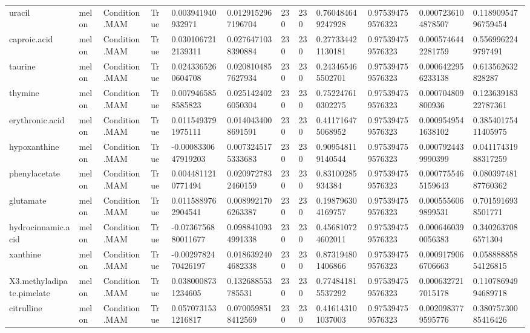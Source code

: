 \begin{longtable}{llllllllllll}
uracil & melon & Condition.MAM & True & 0.003941940932971 & 0.0129152967196704 & 230 & 230 & 0.760484649247928 & 0.975394759576323 & 0.0007236104878507 & 0.11890954796759454 \\
caproic.acid & melon & Condition.MAM & True & 0.0301067212139311 & 0.0276471038390884 & 230 & 230 & 0.277334421130181 & 0.975394759576323 & 0.0005746442281759 & 0.5569962249797491 \\
taurine & melon & Condition.MAM & True & 0.0243365260604708 & 0.0208104857627934 & 230 & 230 & 0.243465465502701 & 0.975394759576323 & 0.0006422956233138 & 0.613562632828287 \\
thymine & melon & Condition.MAM & True & 0.0079465858585823 & 0.0251424026050304 & 230 & 230 & 0.752247610302275 & 0.975394759576323 & 0.000704809800936 & 0.12363918322787361 \\
erythronic.acid & melon & Condition.MAM & True & 0.0115493791975111 & 0.0140434008691591 & 230 & 230 & 0.411716475068952 & 0.975394759576323 & 0.0009549541638102 & 0.38540175411405975 \\
hypoxanthine & melon & Condition.MAM & True & -0.0008330647919203 & 0.0073245175333683 & 230 & 230 & 0.909548119140544 & 0.975394759576323 & 0.0007924439990399 & 0.04117431988317259 \\
phenylacetate & melon & Condition.MAM & True & 0.0044811210771494 & 0.0209727832460159 & 230 & 230 & 0.83100285934384 & 0.975394759576323 & 0.0007755465159643 & 0.08039748187760362 \\
glutamate & melon & Condition.MAM & True & 0.0115889762904541 & 0.0089921706263387 & 230 & 230 & 0.198796304169757 & 0.975394759576323 & 0.0005556069899531 & 0.7015916938501771 \\
hydrocinnamic.acid & melon & Condition.MAM & True & -0.0736756880011677 & 0.0988410934991338 & 230 & 230 & 0.456810724602011 & 0.975394759576323 & 0.0006460390056383 & 0.3402637086571304 \\
xanthine & melon & Condition.MAM & True & -0.0029782470426197 & 0.0186392404682338 & 230 & 230 & 0.873194801406866 & 0.975394759576323 & 0.0009179066706663 & 0.05888885854126815 \\
X3.methyladipate.pimelate & melon & Condition.MAM & True & 0.0380008731234605 & 0.132688553785531 & 230 & 230 & 0.774841815537292 & 0.975394759576323 & 0.0006327217015178 & 0.11078694994689718 \\
citrulline & melon & Condition.MAM & True & 0.0570731531216817 & 0.0700598518412569 & 230 & 230 & 0.416143101037003 & 0.975394759576323 & 0.0020983779595776 & 0.38075730085416426 \\

\end{longtable}
